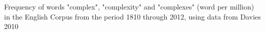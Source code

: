 \textbf{\label{fig:ComplexityFrequency}} Frequency of words "complex", "complexity" and "complexes" (word per million) in the English Corpus from the period 1810 through 2012, using data from Davies 2010
